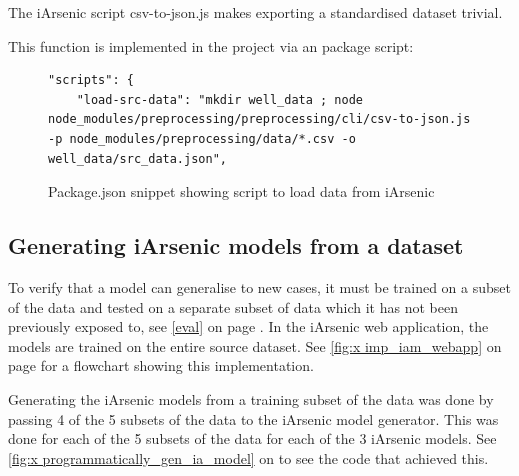 The iArsenic script csv-to-json.js makes exporting a standardised dataset trivial.

This function is implemented in the project via an package script:

\begin{figure}[ht]
\begin{verbatim}
"scripts": {
    "load-src-data": "mkdir well_data ; node node_modules/preprocessing/preprocessing/cli/csv-to-json.js -p node_modules/preprocessing/data/*.csv -o well_data/src_data.json",
\end{verbatim}
\label{fig:x load_ia_data}
\caption{Package.json snippet showing script to load data from iArsenic}
\end{figure}

\subsection{Generating iArsenic models from a dataset}

To verify that a model can generalise to new cases, it must be trained on a subset of the data and tested on a separate subset of data which it has not been previously exposed to, see \ref{eval} on page \pageref{eval}. In the iArsenic web application, the models are trained on the entire source dataset. See \ref{fig:x imp_iam_webapp} on page \pageref{fig:x imp_iam_webapp} for a flowchart showing this implementation.

Generating the iArsenic models from a training subset of the data was done by passing 4 of the 5 subsets of the data to the iArsenic model generator. This was done for each of the 5 subsets of the data for each of the 3 iArsenic models. See \ref{fig:x programmatically_gen_ia_model} on \pageref{fig:x programmatically_gen_ia_model} to see the code that achieved this.


